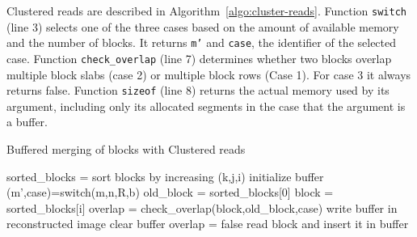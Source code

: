 \documentclass[10pt, conference, compsocconf]{IEEEtran}
\begin{document}
Clustered reads are described in
Algorithm~\ref{algo:cluster-reads}. Function \texttt{switch} (line 3)
selects one of the three cases based on the amount of available memory
and the number of blocks. It returns \texttt{m'} and \texttt{case},
the identifier of the selected case. Function \texttt{check\_overlap}
(line 7) determines whether two blocks overlap multiple block slabs
(case 2) or multiple block rows (Case 1). For case 3 it always returns
false.  Function \texttt{sizeof} (line 8) returns the actual memory
used by its argument, including only its allocated segments in the
case that the argument is a buffer.
\begin{algorithm}[h]
  \caption{Buffered merging of blocks with Clustered reads}
  \label{algo:cluster-reads}
  \begin{algorithmic}[1]
    \STATE sorted\_blocks = sort blocks by increasing (k,j,i)
    \STATE initialize buffer
    \STATE (m',case)=switch(m,n,R,b)
    \STATE old\_block = sorted\_blocks[0]
      \STATE block = sorted\_blocks[i]
      \STATE overlap = check\_overlap(block,old\_block,case)
      \STATE write buffer in reconstructed image
      \STATE clear buffer
      \STATE overlap = false
      \ENDIF
      \STATE read block and insert it in buffer
      \ENDFOR
  \end{algorithmic}
\end{algorithm}
\end{document}
